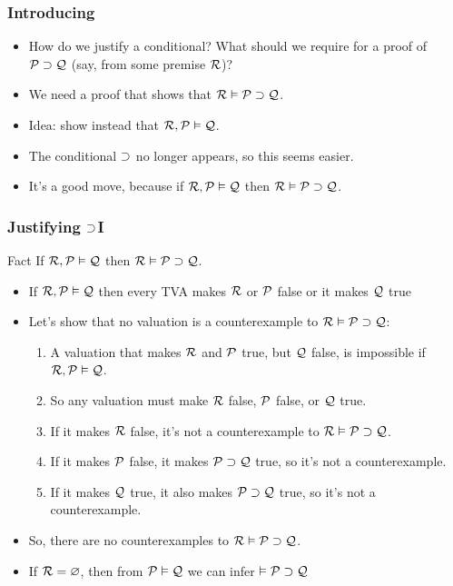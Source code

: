 \begin{frame}
  \frametitle{Introducing \eif}

  \begin{itemize}[<+->]
  \item How do we justify a conditional? What should we require for a proof
  of $\mathcal{P} \supset \mathcal{Q}$ (say, from some premise $\mathcal{R}$)?

  \item We need a proof that shows that $\mathcal{R} \vDash \mathcal{P} \supset
  \mathcal{Q}$.

  \item Idea: show instead that $\mathcal{R}, \mathcal{P} \vDash \mathcal{Q}$.

  \item The conditional $\supset$ no longer appears, so this seems easier.

  \item It's a good move, because if $\mathcal{R}, \mathcal{P} \vDash
  \mathcal{Q}$
  then $\mathcal{R} \vDash \mathcal{P} \supset
  \mathcal{Q}$.
  \end{itemize}
\end{frame}

\begin{frame}
  \frametitle{Justifying $\supset$I}
  \begin{block}{Fact}
  If $\mathcal{R}, \mathcal{P} \vDash
  \mathcal{Q}$
  then
  $\mathcal{R} \vDash \mathcal{P} \supset
  \mathcal{Q}$.
  \end{block}

  \begin{itemize}[<+->]
    \item If $\mathcal{R}, \mathcal{P} \vDash
    \mathcal{Q}$ then every TVA makes $\mathcal{R}$ or
   $\mathcal{P}$ false or it makes $\mathcal{Q}$ true
    \item Let's show that no valuation is a counterexample to $\mathcal{R} \vDash \mathcal{P} \supset
    \mathcal{Q}$:
    \begin{enumerate}
      \item A valuation that makes $\mathcal{R}$ and
    $\mathcal{P}$ true, but $\mathcal{Q}$ false, is impossible if  $\mathcal{R}, \mathcal{P} \vDash
    \mathcal{Q}$.
    \item So any valuation must make $\mathcal{R}$ false, $\mathcal{P}$
    false, or $\mathcal{Q}$ true.
    \item If it makes $\mathcal{R}$ false, it's not a counterexample to $\mathcal{R} \vDash \mathcal{P} \supset
    \mathcal{Q}$.
    \item If it makes $\mathcal{P}$ false, it makes $\mathcal{P} \supset
    \mathcal{Q}$ true, so it's not a counterexample.
    \item If it makes $\mathcal{Q}$ true, it also makes $\mathcal{P} \supset
    \mathcal{Q}$ true, so it's not a counterexample.
    \end{enumerate}
    \item So, there are no counterexamples to $\mathcal{R} \vDash \mathcal{P} \supset
    \mathcal{Q}$.
\item If $\mathcal{R} = \varnothing$, then from $\mathcal{P} \vDash \mathcal{Q}$ we can infer $ \vDash \mathcal{P} \supset \mathcal{Q}$
  \end{itemize}
\end{frame}

